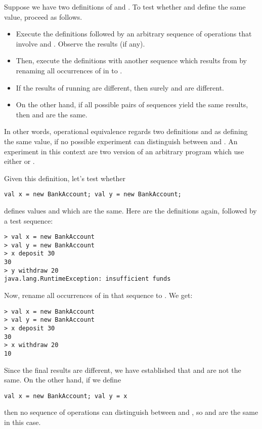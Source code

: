 \documentclass[a4paper,12pt,twoside,titlepage]{book}
\begin{document}
{Suppose we have two definitions of  and .
To test whether  and  define the same value, proceed
as follows.
\begin{itemize}
\item
Execute the definitions followed by an
arbitrary sequence  of operations that involve  and
. Observe the results (if any).
\item
Then, execute the definitions with another sequence  which
results from  by renaming all occurrences of  in
 to .
\item
If the results of running  are different, then surely
 and  are different.
\item
On the other hand, if all possible pairs of sequences 
yield the same results, then  and  are the same.
\end{itemize}
In other words, operational equivalence regards two definitions
 and  as defining the same value, if no possible
experiment can distinguish between  and . An
experiment in this context are two version of an arbitrary program which use either
 or .
 
Given this definition, let's test whether
\begin{lstlisting}
val x = new BankAccount; val y = new BankAccount;
\end{lstlisting}
defines values  and  which are the same.
Here are the definitions again, followed by a test sequence:

\begin{lstlisting}
> val x = new BankAccount
> val y = new BankAccount
> x deposit 30
30
> y withdraw 20
java.lang.RuntimeException: insufficient funds
\end{lstlisting}

Now, rename all occurrences of  in that sequence to
. We get:
\begin{lstlisting}
> val x = new BankAccount
> val y = new BankAccount
> x deposit 30
30
> x withdraw 20
10
\end{lstlisting}
Since the final results are different, we have established that
 and  are not the same.
On the other hand, if we define
\begin{lstlisting}
val x = new BankAccount; val y = x
\end{lstlisting}
then no sequence of operations can distinguish between  and
, so  and  are the same in this case.

}
\end{document}

